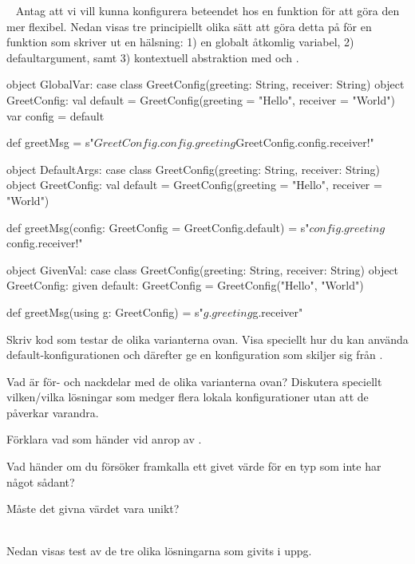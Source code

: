 \Task  \what~ Antag att vi vill kunna konfigurera beteendet hos en funktion för att göra den mer flexibel. Nedan visas tre principiellt olika sätt att göra detta på för en funktion  som skriver ut en hälsning: 1) en globalt åtkomlig variabel, 2) defaultargument, samt 3) kontextuell abstraktion med  och .

\begin{Code}
object GlobalVar:
  case class GreetConfig(greeting: String, receiver: String)
  object GreetConfig:
    val default = GreetConfig(greeting = "Hello", receiver = "World")
    var config = default
  
  def greetMsg = 
    s"${GreetConfig.config.greeting} ${GreetConfig.config.receiver}!"

object DefaultArgs:
  case class GreetConfig(greeting: String, receiver: String)
  object GreetConfig:
    val default = GreetConfig(greeting = "Hello", receiver = "World")
  
  def greetMsg(config: GreetConfig = GreetConfig.default) =
    s"${config.greeting} ${config.receiver}!"

object GivenVal:
  case class GreetConfig(greeting: String, receiver: String)
  object GreetConfig:
    given default: GreetConfig = GreetConfig("Hello", "World")
  
  def greetMsg(using g: GreetConfig) = s"${g.greeting} ${g.receiver}"
\end{Code}

\Subtask Skriv kod som testar de olika varianterna ovan. Visa speciellt hur du kan använda default-konfigurationen och därefter ge en konfiguration som skiljer sig från . 

\Subtask Vad är för- och nackdelar med de olika varianterna ovan? Diskutera speciellt vilken/vilka lösningar som medger flera lokala konfigurationer utan att de påverkar varandra.

\Subtask Förklara vad som händer vid anrop av . 

\Subtask Vad händer om du försöker framkalla ett givet värde för en typ som inte har något sådant?

\Subtask Måste det givna värdet vara unikt?

\SOLUTION


\TaskSolved \what\\

\noindent Nedan visas test av de tre olika lösningarna som givits i uppg. \SubtaskSolved

